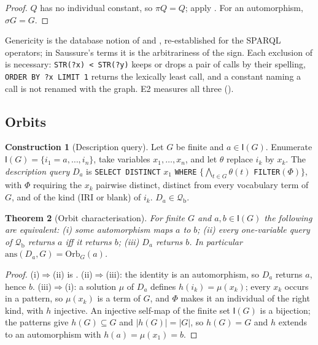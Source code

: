 \documentclass[11pt,twocolumn,a4paper]{article}
\theoremstyle{plain}
\newtheorem{theorem}{Theorem}[section]
\theoremstyle{definition}
\newtheorem{construction}[theorem]{Construction}
\theoremstyle{remark}
\newcommand{\G}{G}
\newcommand{\Iset}{\mathsf{I}}
\newcommand{\Qfrag}{\mathcal{Q}_{\mathrm{b}}}
\newcommand{\ans}{\mathrm{ans}}
\newcommand{\orb}{\mathrm{Orb}}
\begin{document}
\begin{proof}
$Q$ has no individual constant, so $\pi Q=Q$; apply . For an
automorphism, $\sigma\G=\G$.
\end{proof}

Genericity is the database notion of \citet{chandra1980} and
\citet{abiteboul1995}, re-established for the SPARQL operators; in Saussure's
terms it is the arbitrariness of the sign. Each exclusion of 
is necessary: \texttt{STR(?x) < STR(?y)} keeps or drops a pair of calls by
their spelling, \texttt{ORDER BY ?x LIMIT 1} returns the lexically least call,
and a constant naming a call is not renamed with the graph. E2 measures all
three ().

\subsection{Orbits}

\begin{construction}[Description query]
\label{con:desc}
Let $\G$ be finite and $a\in\Iset(\G)$. Enumerate $\Iset(\G)=\{i_1=a,\dots,i_n\}$,
take variables $x_1,\dots,x_n$, and let $\theta$ replace $i_k$ by $x_k$. The
\emph{description query} $D_a$ is
\texttt{SELECT DISTINCT} $x_1$ \texttt{WHERE} $\{\bigwedge_{t\in\G}\theta(t)$
\texttt{FILTER}$(\Phi)\}$, with $\Phi$ requiring the $x_k$ pairwise distinct,
distinct from every vocabulary term of $\G$, and of the kind (IRI or blank) of
$i_k$. $D_a\in\Qfrag$.
\end{construction}

\begin{theorem}[Orbit characterisation]
\label{thm:orbit}
For finite $\G$ and $a,b\in\Iset(\G)$ the following are equivalent: (i) some
automorphism maps $a$ to $b$; (ii) every one-variable query of $\Qfrag$ returns
$a$ iff it returns $b$; (iii) $D_a$ returns $b$. In particular
$\ans(D_a,\G)=\orb_\G(a)$.
\end{theorem}

\begin{proof}
(i)$\Rightarrow$(ii) is . (ii)$\Rightarrow$(iii): the identity
is an automorphism, so $D_a$ returns $a$, hence $b$. (iii)$\Rightarrow$(i): a
solution $\mu$ of $D_a$ defines $h(i_k)=\mu(x_k)$; every $x_k$ occurs in a
pattern, so $\mu(x_k)$ is a term of $\G$, and $\Phi$ makes it an individual of
the right kind, with $h$ injective. An injective self-map of the finite set
$\Iset(\G)$ is a bijection; the patterns give $h(\G)\subseteq\G$ and
$|h(\G)|=|\G|$, so $h(\G)=\G$ and $h$ extends to an automorphism with
$h(a)=\mu(x_1)=b$.
\end{proof}
\end{document}
